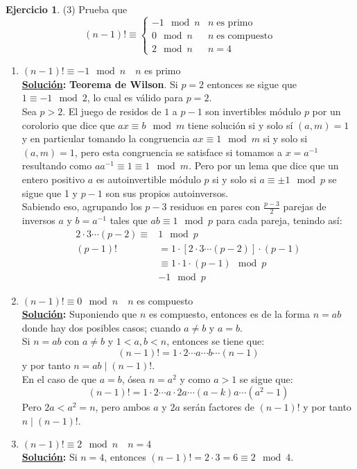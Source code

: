 \documentclass[11pt,letterpaper]{article}
\theoremstyle{definition}\newtheorem{p}{Ejercicio}
\newcommand{\sol}{\textbf{\underline{Solución}: }} %
\begin{document}
\begin{p}(3)
Prueba que
\[
  (n-1)! \equiv
  \begin{cases}
    -1\mod n & n\;\text{es primo} \\
    0\mod n & n\;\text{es compuesto} \\
    2\mod n & n=4
  \end{cases}
\]

\begin{enumerate}
    \item $(n-1)! \equiv -1 \mod{n} \quad n$ es primo\\
    \sol \textbf{Teorema de Wilson}. Si $p=2$ entonces se sigue que $1 \equiv -1 \mod{2}$, lo cual es 
    válido para $p=2$.\\
    Sea $p>2$. El juego de residos de $1$ a $p-1$ son invertibles módulo $p$ por un corolorio que dice
    que $ax \equiv b \mod{m}$ tiene solución si y solo sí $(a,m) = 1$ y en particular tomando la
    congruencia $ax \equiv 1 \mod m$ si y solo si $(a,m) = 1$, pero esta congruencia se satisface si 
    tomamos a $x = a^{-1}$ resultando como $a a^{-1} \equiv 1 \equiv 1 \mod{m}$. Pero por un lema que dice
    que un entero positivo $a$ es autoinvertible módulo $p$ si y solo si $a \equiv \pm 1 \mod{p}$ se
    sigue que 1 y $p-1$ son sus propios autoinversos.\\
    Sabiendo eso, agrupando los $p-3$ residuos en pares con $\frac{p-3}{2}$ parejas de inversos $a$
    y $b=a^{-1}$ tales que $ab \equiv 1 \mod{p}$ para cada pareja, tenindo así:
    \begin{align*}
        2 \cdot 3 \cdots (p-2) \equiv & 1 \mod{p}\\
        (p-1)! &= 1 \cdot [2 \cdot 3 \cdots (p-2)] \cdot (p-1)\\
            &\equiv 1 \cdot 1 \cdot (p-1) \mod{p}\\
            &-1 \mod{p}
    \end{align*}

    \item $(n-1)! \equiv 0 \mod{n} \quad n$ es compuesto\\
    \sol Suponiendo que $n$ es compuesto, entonces es de la forma $n=ab$ donde hay dos posibles
    casos; cuando $a \neq b$ y $a = b$.\\
    Si $n=ab$ con $a \neq b$ y $1 < a,b < n$, entonces se tiene que:
    $$(n-1)! = 1 \cdot 2 \cdots a \cdots b \cdots (n-1)$$
    y por tanto $n = ab \mid (n-1)!$.\\
    En el caso de que $a = b$, ósea $n = a^2$ y como $a > 1$ se sigue que:
    $$(n-1)! = 1 \cdot 2 \cdots a \cdot 2a \cdots (a-k)a \cdots (a^2 - 1)$$
    Pero $2a < a^2 = n$, pero ambos $a$ y $2a$ serán factores de $(n-1)!$ y por tanto
    $n \mid (n-1)!$.


    \item $(n-1)! \equiv 2 \mod{n} \quad n=4$\\
    \sol Si $n = 4$, entonces $(n-1)! = 2 \cdot 3 = 6 \equiv 2 \mod{4}$.
\end{enumerate}
\end{p}
\end{document}
